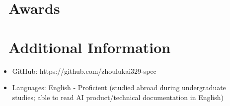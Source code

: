 \documentclass{resume}
\begin{document}
\section{\texorpdfstring{{\normalfont\faHeartO}\ }{}Awards}

\section{\texorpdfstring{{\normalfont\faInfo}\ }{}Additional Information}
\begin{itemize}[parsep=0.5ex]
  \item GitHub: https://github.com/zhoulukai329-spec
  \item Languages: English - Proficient (studied abroad during undergraduate studies; able to read AI product/technical documentation in English)
\end{itemize}

%
%
\end{document}
